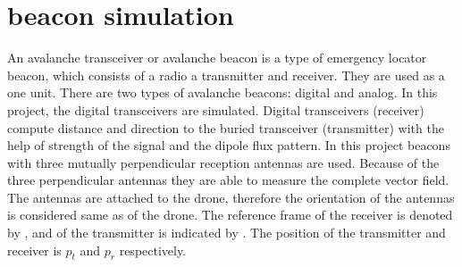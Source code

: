\documentclass[conference]{IEEEtran}
\begin{document}
\section{beacon simulation}
\label{beacon simulation}
An avalanche transceiver or avalanche beacon is a type of emergency locator beacon, which consists of a radio a transmitter and receiver. They are used as a one unit. There are two types of avalanche beacons: digital and analog. In this project, the digital transceivers are simulated. Digital transceivers (receiver) compute distance and direction to the buried transceiver (transmitter) with the help of strength of the signal and the dipole flux pattern. In this project beacons with three mutually perpendicular reception antennas are used. Because of the three perpendicular antennas they are able to measure the complete vector field. The antennas are attached to the drone, therefore the orientation of the antennas is considered same as of the drone. The reference frame of the receiver is denoted by , and of the transmitter is indicated by . The position of the transmitter and receiver is $p_t$ and $p_r$ respectively.  
\end{document}
